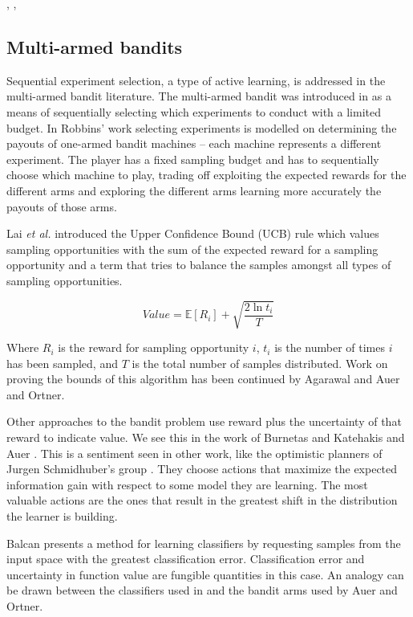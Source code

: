 			\cite{ferguson1989solved}, \cite{presman1972best}, \cite{vanderbei1980optimal}

\subsection{Multi-armed bandits}

Sequential experiment selection, a type of active learning, is addressed in the
multi-armed bandit literature.  The multi-armed bandit was introduced in
\cite{robbins1952some} as a means of sequentially selecting which experiments
to conduct with a limited budget.  In Robbins' work \cite{robbins1952some}
selecting experiments is modelled on determining the
payouts of one-armed bandit machines -- each machine represents a different
experiment.  The player has a fixed sampling budget and has to sequentially
choose which machine to play, trading off exploiting the expected rewards for
the different arms and exploring the different arms learning more accurately
the payouts of those arms.  

Lai \emph{et al.} \cite{lai1985asymptotically} introduced the Upper Confidence
Bound (UCB) rule which values sampling opportunities with the sum of the expected reward for a sampling opportunity and a term that tries to balance the samples amongst all types of sampling opportunities.

$$
Value = \mathbb{E}\left[R_i\right] + \sqrt{\frac{2\ln t_i}{T}}
$$

Where $R_i$ is the reward for sampling opportunity $i$, $t_i$ is the number of times $i$ has been sampled, and $T$ is the total number of samples distributed.  Work on proving the bounds of this algorithm has been continued by Agarawal \cite{agrawal1995sample} and Auer and Ortner\cite{auer2010ucb}.  


Other approaches to the bandit problem use reward plus the uncertainty of that
reward to indicate value.  We see this in the work of Burnetas and Katehakis
\cite{burnetas1997optimal} and Auer \cite{auer2003using}.  This is a sentiment
seen in other work, like the optimistic planners of Jurgen Schmidhuber's group
\cite{schmidhuber1997what,schmidhuber2003exploring,schmidhuber2009simple,sun2011planning}.
They choose actions that maximize the expected information gain with respect to
some model they are learning.  The most valuable actions are the ones that
result in the greatest shift in the distribution the learner is building.

Balcan \cite{balcan2006agnostic} presents a method for learning classifiers by
requesting samples from the input space with the greatest classification
error.  Classification error and uncertainty in function value
are fungible quantities in this case.  An analogy can be drawn between
the classifiers used in \cite{balcan2006agnostic} and the bandit arms used by
Auer and Ortner\cite{auer2010ucb}.

